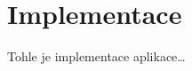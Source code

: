 \hypertarget{implementace}{%
\chapter{Implementace}\label{implementace}}

Tohle je implementace aplikace\ldots{}
